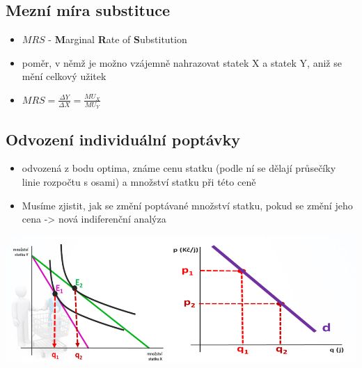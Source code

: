\subsection{Mezní míra substituce}
\begin{itemize}
    \item $MRS$ - \textbf{M}arginal \textbf{R}ate of \textbf{S}ubstitution
    \item poměr, v němž je možno vzájemně nahrazovat statek X a statek Y, aniž se mění celkový užitek
    \item $MRS=\frac{\Delta Y}{\Delta X}=\frac{MU_X}{MU_Y}$
\end{itemize}

\subsection{Odvození individuální poptávky}
\begin{itemize}
    \item odvozená z bodu optima, známe cenu statku (podle ní se dělají průsečíky linie rozpočtu s osami) a množství statku při této ceně
    \item Musíme zjistit, jak se změní poptávané množství statku, pokud se změní jeho cena -> nová indiferenční analýza
\end{itemize}
\includegraphics[width=16cm]{images/06_poptavka_indif.png}
